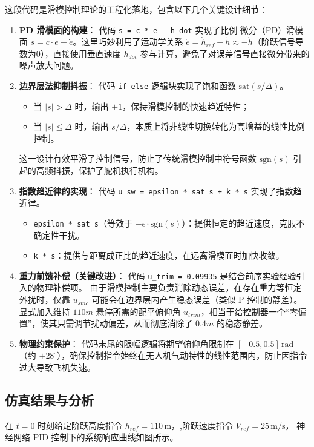 \documentclass[UTF8, a4paper, 12pt]{ctexart}
\begin{document}
这段代码是滑模控制理论的工程化落地，包含以下几个关键设计细节：
\begin{enumerate}
    \item \textbf{PD 滑模面的构建}：
    代码 \texttt{s = c * e - h\_dot} 实现了比例-微分（PD）滑模面 $s = c \cdot e + \dot{e}$。这里巧妙利用了运动学关系 $\dot{e} = \dot{h}_{ref} - \dot{h} \approx -\dot{h}$（阶跃信号导数为0），直接使用垂直速度 $h_{dot}$ 参与计算，避免了对误差信号直接微分带来的噪声放大问题。

    \item \textbf{边界层法抑制抖振}：
    代码 \texttt{if-else} 逻辑块实现了饱和函数 $\text{sat}(s/\Delta)$。
    \begin{itemize}
        \item 当 $|s| > \Delta$ 时，输出 $\pm 1$，保持滑模控制的快速趋近特性；
        \item 当 $|s| \le \Delta$ 时，输出 $s/\Delta$，本质上将非线性切换转化为高增益的线性比例控制。
    \end{itemize}
    这一设计有效平滑了控制信号，防止了传统滑模控制中符号函数 $\text{sgn}(s)$ 引起的高频抖振，保护了舵机执行机构。

    \item \textbf{指数趋近律的实现}：
    代码 \texttt{u\_sw = epsilon * sat\_s + k * s} 实现了指数趋近律。
    \begin{itemize}
        \item \texttt{epsilon * sat\_s}（等效于 $-\epsilon \cdot \text{sgn}(s)$）：提供恒定的趋近速度，克服不确定性干扰。
        \item \texttt{k * s}：提供与距离成正比的趋近速度，在远离滑模面时加快收敛。
    \end{itemize}

    \item \textbf{重力前馈补偿（关键改进）}：
    代码 \texttt{u\_trim = 0.09935} 是结合前序实验经验引入的物理补偿项。
    由于滑模控制主要负责消除动态误差，在存在重力等恒定外扰时，仅靠 $u_{smc}$ 可能会在边界层内产生稳态误差（类似 P 控制的静差）。显式加入维持 $110m$ 悬停所需的配平俯仰角 $u_{trim}$，相当于给控制器一个“零偏置”，使其只需调节扰动偏差，从而彻底消除了 $0.4m$ 的稳态静差。

    \item \textbf{物理约束保护}：
    代码末尾的限幅逻辑将期望俯仰角限制在 $[-0.5, 0.5]\, \text{rad}$（约 $\pm 28^\circ$），确保控制指令始终在无人机气动特性的线性范围内，防止因指令过大导致飞机失速。
\end{enumerate}

\subsection{仿真结果与分析}
在 $t=0$ 时刻给定阶跃高度指令 $h_{ref} = 110\,\text{m}$，,阶跃速度指令 $V_{ref} = 25\,\text{m/s}$，
神经网络 PID 控制下的系统响应曲线如图所示。
\end{document}
